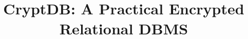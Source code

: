 \documentclass{sig-alternate-10pt}
\begin{document}
%

\title{CryptDB: A Practical Encrypted Relational DBMS}



\newcommand{\RND}{\mathsf{RND}}
\newcommand{\DET}{\mathsf{DET}}
\newcommand{\OPE}{\mathsf{OPE}}
\newcommand{\OPEJOIN}{\mathsf{OPE}\mathrm{-}\mathsf{JOIN}}
\newcommand{\HOM}{\mathsf{HOM}}
\newcommand{\JOIN}{\mathsf{JOIN}}
\newcommand{\SEARCH}{\mathsf{SEARCH}}

\newcommand{\up}{\texttt{UPDATE}}
\newcommand{\ins}{\texttt{INSERT}}
\newcommand{\del}{\texttt{DELETE}}
\newcommand{\sel}{\texttt{SELECT}}

%
%
%
%
%
\end{document}
